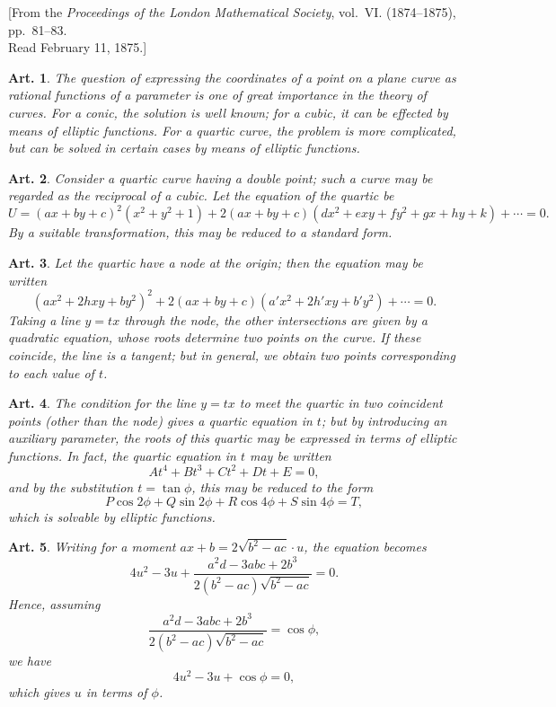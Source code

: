 \documentclass[12pt,a4paper]{article}
\theoremstyle{cayley}
\newtheorem{art}{Art.}[section]
\begin{document}
\begin{center}
{\small [From the \textit{Proceedings of the London Mathematical Society}, vol.~VI. (1874--1875), pp.~81--83.\\
Read February 11, 1875.]}
\end{center}

\begin{art}
The question of expressing the coordinates of a point on a plane curve as rational functions of a parameter is one of great importance in the theory of curves. For a conic, the solution is well known; for a cubic, it can be effected by means of elliptic functions. For a quartic curve, the problem is more complicated, but can be solved in certain cases by means of elliptic functions.
\end{art}

\begin{art}
Consider a quartic curve having a double point; such a curve may be regarded as the reciprocal of a cubic. Let the equation of the quartic be
\[
U = (ax + by + c)^2(x^2 + y^2 + 1) + 2(ax + by + c)(dx^2 + exy + fy^2 + gx + hy + k) + \cdots = 0.
\]
By a suitable transformation, this may be reduced to a standard form.
\end{art}

\begin{art}
Let the quartic have a node at the origin; then the equation may be written
\[
(ax^2 + 2hxy + by^2)^2 + 2(ax + by + c)(a'x^2 + 2h'xy + b'y^2) + \cdots = 0.
\]
Taking a line $y = tx$ through the node, the other intersections are given by a quadratic equation, whose roots determine two points on the curve. If these coincide, the line is a tangent; but in general, we obtain two points corresponding to each value of $t$.
\end{art}

\begin{art}
The condition for the line $y = tx$ to meet the quartic in two coincident points (other than the node) gives a quartic equation in $t$; but by introducing an auxiliary parameter, the roots of this quartic may be expressed in terms of elliptic functions. In fact, the quartic equation in $t$ may be written
\[
At^4 + Bt^3 + Ct^2 + Dt + E = 0,
\]
and by the substitution $t = \tan\phi$, this may be reduced to the form
\[
P\cos 2\phi + Q\sin 2\phi + R\cos 4\phi + S\sin 4\phi = T,
\]
which is solvable by elliptic functions.
\end{art}

\begin{art}
Writing for a moment $ax + b = 2\sqrt{b^2-ac} \cdot u$, the equation becomes
\[
4u^2 - 3u + \frac{a^2d - 3abc + 2b^3}{2(b^2-ac)\sqrt{b^2-ac}} = 0.
\]
Hence, assuming
\[
\frac{a^2d - 3abc + 2b^3}{2(b^2-ac)\sqrt{b^2-ac}} = \cos\phi,
\]
we have
\[
4u^2 - 3u + \cos\phi = 0,
\]
which gives $u$ in terms of $\phi$.
\end{art}
\end{document}

